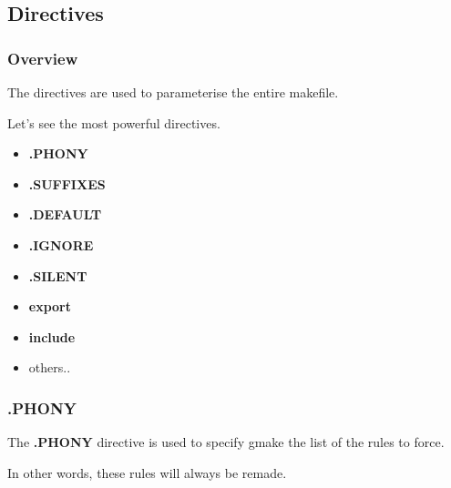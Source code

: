 %
%

\subsection{Directives}


\begin{frame}
  \frametitle{Overview}

  The directives are used to parameterise the entire makefile.

  \nl

  Let's see the most powerful directives.

  \begin{itemize}[<+->]
    \item
      \textbf{.PHONY}
    \item
      \textbf{.SUFFIXES}
    \item
      \textbf{.DEFAULT}
    \item
      \textbf{.IGNORE}
    \item
      \textbf{.SILENT}
    \item
      \textbf{export}
    \item
      \textbf{include}
    \item
      others..
  \end{itemize}
\end{frame}


\begin{frame}
  \frametitle{\textbf{.PHONY}}

  The \textbf{.PHONY} directive is used to specify gmake the list of the
  rules to force.

  \nl

  In other words, these rules will always be remade.
\end{frame}



